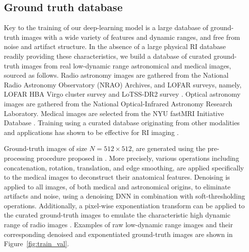 \documentclass[preprint2,twocolumn]{aastex631}
\begin{document}
\subsection{Ground truth database}\label{subsec:Ground-truth-database}
{Key to the training of our deep-learning model is a large database of ground-truth images with a wide variety of features and dynamic ranges, and free from noise and artifact structure. In the absence of a large physical RI database readily providing these characteristics, we build a database of curated ground-truth images from real low-dynamic range astronomical and medical images, sourced as follows.
Radio astronomy images} are gathered from the National Radio Astronomy Observatory (NRAO) Archives, and LOFAR surveys, namely, LOFAR HBA Virgo cluster survey \citep{edler2023} and LoTSS-DR2 survey \citep{shimwell2022}. Optical astronomy images are gathered from the National Optical-Infrared Astronomy Research Laboratory. Medical images are selected from the NYU fastMRI Initiative Database \citep{zbontar2018fastmri,knoll2020fastmri}.
{Training using a curated database originating from other modalities and applications has shown to be effective for RI imaging \citep{terris2022,terris2023plug}}.

{Ground-truth images of size $N=512\times 512$,} are generated using the pre-processing procedure proposed in \citet{terris2023plug}. More precisely, various operations including concatenation, rotation, translation, and edge smoothing, are applied specifically to the medical images to deconstruct their anatomical features. Denoising is applied to all images, of both medical and astronomical origins, to eliminate artifacts and noise, using a denoising DNN \citep{zhang2023practical} in combination with soft-thresholding operations. Additionally, a pixel-wise exponentiation transform can be applied to the curated ground-truth images to emulate the characteristic high dynamic range of radio images \citep{terris2022}. Examples of raw low-dynamic range images and their corresponding denoised and exponentiated ground-truth images are shown in Figure~\ref{fig:train_val}. 
 
\end{document}
